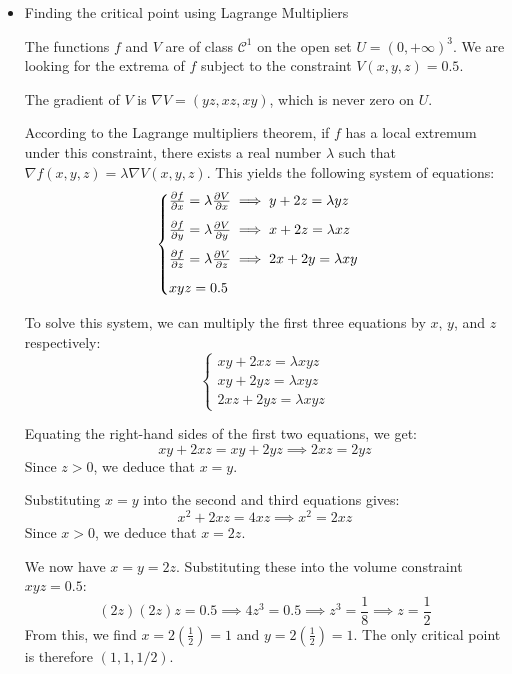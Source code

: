 \documentclass[12pt, openany]{article}
\begin{document}
\begin{itemize}
    We want to minimize the surface area function:
    $$f(x, y, z) = xy + 2xz + 2yz$$
    (we have removed the top face).

    \item Finding the critical point using Lagrange Multipliers
    
    The functions $f$ and $V$ are of class $\mathcal{C}^1$ on the open set $U = (0, +\infty)^3$. We are looking for the extrema of $f$ subject to the constraint $V(x,y,z) = 0.5$.

    The gradient of $V$ is $\nabla V = (yz, xz, xy)$, which is never zero on $U$. 
    
    According to the Lagrange multipliers theorem, if $f$ has a local extremum under this constraint, there exists a real number $\lambda$ such that $\nabla f(x, y, z) = \lambda \nabla V(x, y, z)$. 
    This yields the following system of equations:
    \begin{equation}
    \begin{cases}
        \pdv{f}{x} = \lambda \pdv{V}{x} \implies y + 2z = \lambda yz \\[1.5ex]
        \pdv{f}{y} = \lambda \pdv{V}{y} \implies x + 2z = \lambda xz \\[1.5ex]
        \pdv{f}{z} = \lambda \pdv{V}{z} \implies 2x + 2y = \lambda xy \\[1.5ex]
        xyz = 0.5
    \end{cases}
    \end{equation}
    
    To solve this system, we can multiply the first three equations by $x$, $y$, and $z$ respectively:
    \begin{equation*}
    \begin{cases}
        xy + 2xz = \lambda xyz \\
        xy + 2yz = \lambda xyz \\
        2xz + 2yz = \lambda xyz
    \end{cases}
    \end{equation*}

    Equating the right-hand sides of the first two equations, we get:
    $$xy + 2xz = xy + 2yz \implies 2xz = 2yz$$
    Since $z > 0$, we deduce that $x = y$. 
    
    Substituting $x = y$ into the second and third equations gives:
    $$x^2 + 2xz = 4xz \implies x^2 = 2xz$$
    Since $x > 0$, we deduce that $x = 2z$. 
    
    We now have $x = y = 2z$. Substituting these into the volume constraint $xyz = 0.5$:
    $$(2z)(2z)z = 0.5 \implies 4z^3 = 0.5 \implies z^3 = \frac{1}{8} \implies z = \frac{1}{2}$$
    From this, we find $x = 2\left(\frac{1}{2}\right) = 1$ and $y = 2\left(\frac{1}{2}\right) = 1$.
    The only critical point is therefore $(1, 1, 1/2)$.


\end{itemize}
\end{document}

